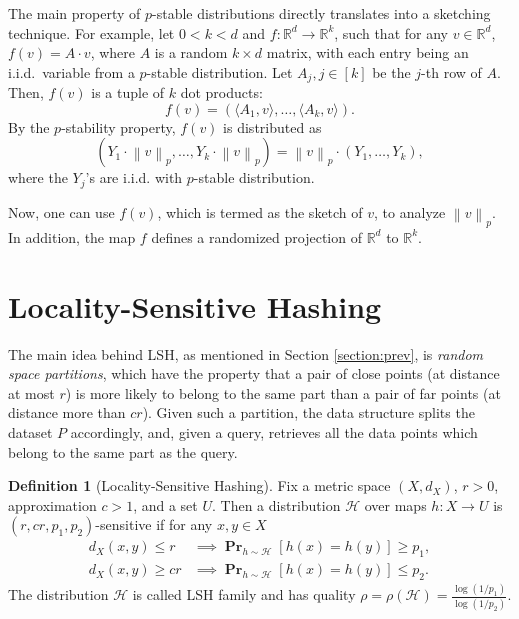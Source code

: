 \documentclass[10pt,a4paper,twoside]{book}
\newcommand{\rd}{\mathbb{R}^{d}}
\newcommand{\rk}{\mathbb{R}^{k}}
\newcommand{\norm}[1]{\left \rVert {#1} \right \rVert}
\DeclareMathOperator*{\prob}{\mathbf{Pr}}
\theoremstyle{definition}
\newtheorem{definition}{Definition}[chapter]
\theoremstyle{remark}
\begin{document}
The main property of $p$-stable distributions directly translates into a sketching technique. For example, let $0<k<d$ and $f: \rd \rightarrow \rk$, such that for any $v \in \rd$, $f(v)=A \cdot v$, where $A$ is a random $k{\times}d$ matrix, with each entry being an i.i.d.\ variable from a $p$-stable distribution. Let $A_j, j \in [k]$ be the $j$-th row of $A$. Then, $f(v)$ is a tuple of $k$ dot products:
\[ f(v) = (\langle A_1, v \rangle, \ldots, \langle A_k, v \rangle). \]
By the $p$-stability property, $f(v)$ is distributed as
\[ (Y_1 \cdot \norm{v}_p, \ldots, Y_k \cdot \norm{v}_p) =  \norm{v}_p \cdot (Y_1, \ldots, Y_k), \]
where the $Y_j$'s are i.i.d. with $p$-stable distribution. 

Now, one can use $f(v)$, which is termed as the sketch of $v$, to analyze $\norm{v}_p$. In addition, the map $f$ defines a randomized projection of $\rd$ to $\rk$.

\section{Locality-Sensitive Hashing} \label{section:lsh}
The main idea behind LSH, as mentioned in Section \ref{section:prev}, is \textit{random space partitions}, which have the property that a pair of close points (at distance at most $r$) is more likely to belong to the same part than a pair of far points (at distance more than $cr$). Given such a partition, the data structure splits the dataset $P$ accordingly, and, given a query, retrieves all the data points which belong to the same part as the query.

\begin{definition} [Locality-Sensitive Hashing] \label{def:lsh}
Fix a metric space $(X, d_X)$, $r>0$, approximation $c >1$, and a set $U$. Then a distribution $\mathcal{H}$ over maps $h: X \rightarrow U$ is $(r,cr,p_1,p_2)$-sensitive if for any $x,y \in X$
\begin{align*}
    d_X(x,y) \leq r &\implies \prob_{h \sim \mathcal{H}}[h(x) = h(y)] \geq p_1, \\
    d_X(x,y) \geq cr &\implies \prob_{h \sim \mathcal{H}}[h(x) = h(y)] \leq p_2.
\end{align*}
The distribution $\mathcal{H}$ is called LSH family and has quality $\rho = \rho(\mathcal{H}) = \frac{\log{(1/p_1)}}{\log{(1/p_2)}}$.
\end{definition}
\end{document}
